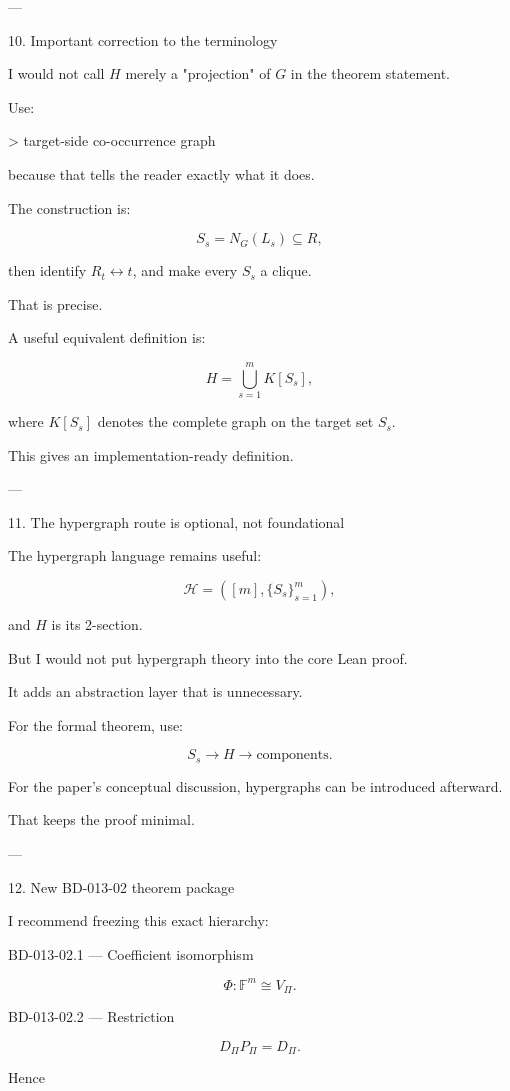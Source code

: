 ---

10. Important correction to the terminology

I would not call \(H\) merely a "projection" of \(G\) in the theorem statement.

Use:

> target-side co-occurrence graph



because that tells the reader exactly what it does.

The construction is:

\[
S_s=N_G(L_s)\subseteq R,
\]

then identify \(R_t\leftrightarrow t\), and make every \(S_s\) a clique.

That is precise.

A useful equivalent definition is:

\[
H
=
\bigcup_{s=1}^m K[S_s],
\]

where \(K[S_s]\) denotes the complete graph on the target set \(S_s\).

This gives an implementation-ready definition.


---

11. The hypergraph route is optional, not foundational

The hypergraph language remains useful:

\[
\mathcal H
=
([m],\{S_s\}_{s=1}^m),
\]

and \(H\) is its 2-section.

But I would not put hypergraph theory into the core Lean proof.

It adds an abstraction layer that is unnecessary.

For the formal theorem, use:

\[
S_s
\rightarrow H
\rightarrow \text{components}.
\]

For the paper's conceptual discussion, hypergraphs can be introduced afterward.

That keeps the proof minimal.


---

12. New BD-013-02 theorem package

I recommend freezing this exact hierarchy:

BD-013-02.1 — Coefficient isomorphism

\[
\Phi:\mathbb F^m\cong V_\Pi.
\]

BD-013-02.2 — Restriction

\[
D_\Pi P_\Pi=D_\Pi.
\]

Hence

